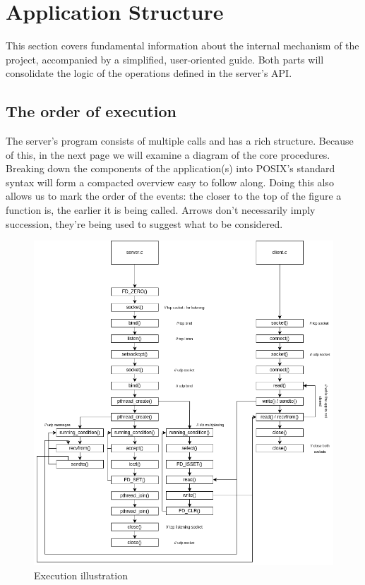 \documentclass[runningheads]{llncs}
\begin{document}

\section{Application Structure}

This section covers fundamental information about the internal mechanism of the project, accompanied by a simplified, user-oriented guide. Both parts will consolidate the logic of the operations defined in the server's API. 

\subsection{The order of execution}

The server's program consists of multiple calls and has a rich structure. Because of this, in the next page we will examine a diagram of the core procedures. Breaking down the components of the application(s) into POSIX's standard syntax will form a compacted overview easy to follow along. Doing this also allows us to mark the order of the events: the closer to the top of the figure a function is, the earlier it is being called. Arrows don't necessarily imply succession, they're being used to suggest what to be considered.

\newpage
\begin{figure}[!h]
    \includegraphics[width=\textwidth]{RR execution diagram.drawio.png}
    \caption{Execution illustration} \label{fig1}
\end{figure}
\end{document}
